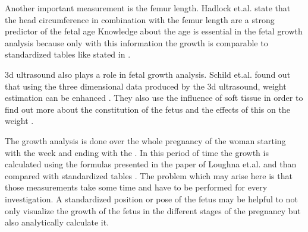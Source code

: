 \newpage
Another important measurement is the femur length. Hadlock et.al. state that the head circumference in combination with the femur length are a strong predictor of the fetal age \cite{Hadlock1984EstimatingParameters.} Knowledge about the age is essential in the fetal growth analysis because only with this information the growth is comparable to standardized tables like stated in \cite{Loughna2009}.\newline\newline

\gls{3d} ultrasound also plays a role in fetal growth analysis. Schild et.al. found out that using the three dimensional data produced by the \gls{3d} ultrasound, weight estimation can be enhanced \cite{Schild2000FetalUltrasound}. They also use the influence of soft tissue in order to find out more about the constitution of the fetus and the effects of this on the weight \cite{Schild2000FetalUltrasound}. \newline

The growth analysis is done over the whole pregnancy of the woman starting with the  week and ending with the  \cite{Loughna2009}. In this period of time the growth is calculated using the formulas presented in the paper of Loughna et.al. and than compared with standardized tables \cite{Loughna2009}. The problem which may arise here is that those measurements take some time and have to be performed for every investigation. A standardized position or pose of the fetus may be helpful to not only visualize the growth of the fetus in the different stages of the pregnancy but also analytically calculate it.  


